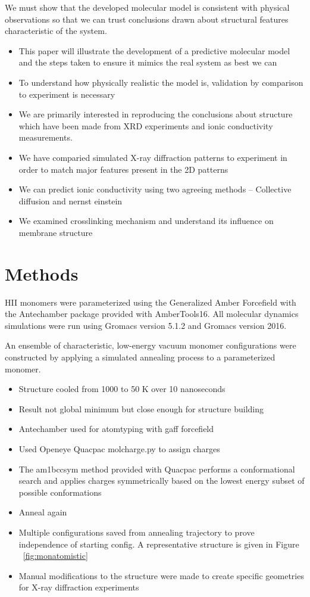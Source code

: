 \documentclass{article}
\begin{document}
	We must show that the developed molecular model is consistent with physical observations so that we can trust conclusions drawn about structural features characteristic of the system.
	\begin{itemize}
		\item This paper will illustrate the development of a predictive molecular model and the steps taken to ensure it mimics the real system as best we can 
		\item To understand how physically realistic the model is, validation by comparison to experiment is necessary
		\item We are primarily interested in reproducing the conclusions about structure which have been made from XRD experiments and ionic conductivity measurements.    
		\item We have comparied simulated X-ray diffraction patterns to experiment in order to match major features present in the 2D patterns
		\item We can predict ionic conductivity using two agreeing methods -- Collective diffusion and nernst einstein
		\item We examined crosslinking mechanism and understand its influence on membrane structure
	\end{itemize}
	
	\section{Methods}
	
	HII monomers were parameterized using the Generalized Amber Forcefield with the Antechamber package provided with AmberTools16. All molecular dynamics simulations were run using Gromacs version 5.1.2 and Gromacs version 2016.
	
	An ensemble of characteristic, low-energy vacuum monomer configurations were constructed by applying a simulated annealing process to a parameterized monomer.
	\begin{itemize}
		\item Structure cooled from 1000 to 50 K over 10 nanoseconds
		\item Result not global minimum but close enough for structure building
		\item Antechamber used for atomtyping with gaff forcefield
		\item Used Openeye Quacpac molcharge.py to assign charges
		\item The am1bccsym method provided with Quacpac performs a conformational search and applies charges symmetrically based on the lowest energy subset of possible conformations
		\item Anneal again 
		\item Multiple configurations saved from annealing trajectory to prove independence of starting config. A representative structure is given in Figure ~\ref{fig:monatomistic}
		\item Manual modifications to the structure were made to create specific geometries for X-ray diffraction experiments
	\end{itemize}
	
\end{document}
